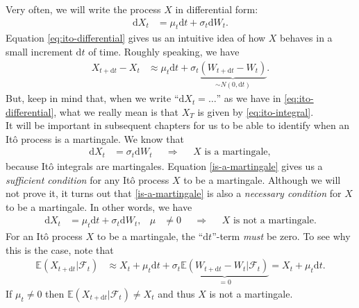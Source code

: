 \documentclass[12pt]{book}
\numberwithin{equation}{chapter}
\theoremstyle{plain}
\numberwithin{theorem}{section}
\theoremstyle{definition}
\numberwithin{exercise}{chapter}
\newcommand{\<}{\langle}
\renewcommand{\>}{\rangle}
\renewcommand{\(}{\left(}
\renewcommand{\)}{\right)}
\renewcommand{\[}{\left[}
\renewcommand{\]}{\right]}
\newcommand\Eb{\mathds{E}}
\newcommand\Fc{\mathscr{F}}
\newcommand\sig{\sigma}
\newcommand\dd{\mathrm{d}}
\theoremstyle{definition}
\numberwithin{question}{section}
\begin{document}
\noindent
Very often, we will write the process $X$ in differential form:
\begin{align}
\dd X_t 
	&= \mu_t \dd t + \sigma_t \dd W_t . \label{eq:ito-differential}
\end{align}
Equation \eqref{eq:ito-differential} gives us an intuitive idea of how $X$ behaves in a small increment $\dd t$ of time.
Roughly speaking, we have
\begin{align}
X_{t + \dd t} - X_t 
	&\approx \mu_t \dd t + \sig_t \underbrace{(W_{t + \dd t} - W_t)}_{\sim N (0, \dd t)}.
\end{align}
But, keep in mind that, when we write ``$\dd X_t = \ldots$'' as we have in \eqref{eq:ito-differential}, what we really mean is that $X_T$ is given by \eqref{eq:ito-integral}.
\\[0.5em]
It will be important in subsequent chapters for us to be able to identify when an It\^o process is a martingale.  We know that
\begin{align}
\dd X_t
	&=	\sig_t \dd W_t &
	&\Rightarrow&
	&\text{$X$ is a martingale}, \label{is-a-martingale}
\end{align}
because It\^o integrals are martingales.  Equation \eqref{is-a-martingale} gives us a \textit{sufficient condition} for any It\^o process $X$ to be a martingale.  Although we will not prove it, it turns out that \eqref{is-a-martingale} is also a \textit{necessary condition} for $X$ to be a martingale.  In other words, we have
\begin{align}
\dd X_t
	&=	\mu_t \dd t + \sig_t \dd W_t , &
\mu
	&\neq 0 &
	&\Rightarrow&
	&\text{$X$ is not a martingale}. \label{is-not-a-martingale}
\end{align}
For an It\^o process $X$ to be a martingale, the ``$\dd t$''-term \textit{must} be zero.  To see why this is the case, note that
\begin{align}
\Eb( X_{t + \dd t} | \Fc_t )
	&\approx	X_t + \mu_t \dd t + \sig_t \underbrace{ \Eb( W_{t + \dd t} - W_t | \Fc_t ) }_{=0} 
	=	X_t + \mu_t \dd t .
\end{align}
If $\mu_t \neq 0$ then $\Eb( X_{t + \dd t} | \Fc_t ) \neq X_t $ and thus $X$ is not a martingale.
\end{document}
